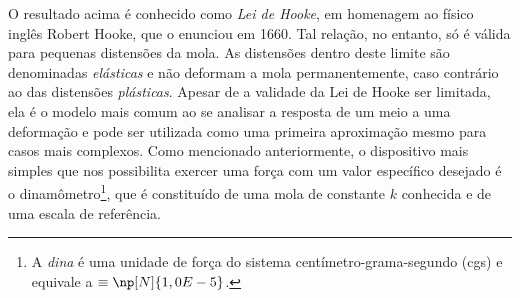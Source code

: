 O resultado acima é conhecido como \emph{Lei de Hooke}, em homenagem ao físico inglês Robert Hooke, que o enunciou em 1660. Tal relação, no entanto, só é válida para pequenas distensões da mola. As distensões dentro deste limite são denominadas \emph{elásticas} e não deformam a mola permanentemente, caso contrário ao das distensões \emph{plásticas}. Apesar de a validade da Lei de Hooke ser limitada, ela é o modelo mais comum ao se analisar a resposta de um meio a uma deformação e pode ser utilizada como uma primeira aproximação mesmo para casos mais complexos. Como mencionado anteriormente, o dispositivo mais simples que nos possibilita exercer uma força com um valor específico desejado é o dinamômetro\footnote[][-8cm]{A \emph{dina} é uma unidade de força do sistema centímetro-grama-segundo (cgs) e equivale a  $\equiv \np[N]{1,0E-5}$.}, que é constituído de uma mola de constante $k$ conhecida e de uma escala de referência.

